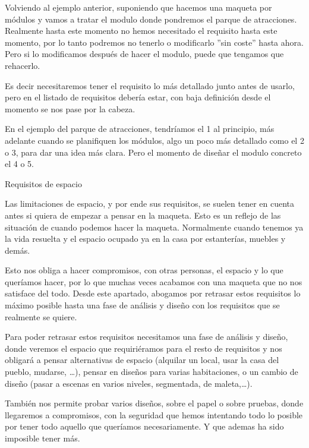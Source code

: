  

Volviendo al ejemplo anterior, suponiendo que hacemos una maqueta por módulos y vamos a tratar el modulo donde pondremos el parque de atracciones. Realmente hasta este momento no hemos necesitado el requisito hasta este momento, por lo tanto podremos no tenerlo o modificarlo ”sin coste” hasta ahora. Pero si lo modificamos después de hacer el modulo, puede que tengamos que rehacerlo. 

 

Es decir necesitaremos tener el requisito lo más detallado junto antes de usarlo, pero en el listado de requisitos debería estar, con baja definición desde el momento se nos pase por la cabeza.  

 

En el ejemplo del parque de atracciones, tendríamos el 1 al principio, más adelante cuando se planifiquen los módulos, algo un poco más detallado como el 2 o 3, para dar una idea más clara. Pero el momento de diseñar el modulo concreto el 4 o 5. 

 

Requisitos de espacio 

Las limitaciones de espacio, y por ende sus requisitos, se suelen tener en cuenta antes si quiera de empezar a pensar en la maqueta. Esto es un reflejo de las situación de cuando podemos hacer la maqueta. Normalmente cuando tenemos ya la vida resuelta y el espacio ocupado ya en la casa por estanterías, muebles y demás. 

 

Esto nos obliga a hacer compromisos, con otras personas, el espacio y lo que queríamos hacer, por lo que muchas veces acabamos con una maqueta que no nos satisface del todo. Desde este apartado, abogamos por retrasar estos requisitos lo máximo posible hasta una fase de análisis y diseño con los requisitos que se realmente se quiere. 

 

Para poder retrasar estos requisitos necesitamos una fase de análisis y diseño, donde veremos el espacio que requiriéramos para el resto de requisitos y nos obligará a pensar alternativas de espacio (alquilar un local, usar la casa del pueblo, mudarse, …), pensar en diseños para varias habitaciones, o un cambio de diseño (pasar a escenas en varios niveles, segmentada, de maleta,…). 

 

También nos permite probar varios diseños, sobre el papel o sobre pruebas, donde llegaremos a compromisos, con la seguridad que hemos intentando todo lo posible por tener todo aquello que queríamos necesariamente. Y que ademas ha sido imposible tener más. 

